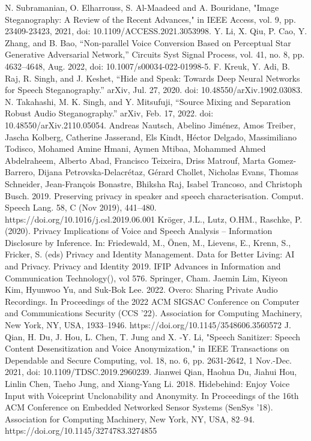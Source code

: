 \documentclass[journal]{IEEEtran} %
\begin{document}
\begin{thebibliography}{00}
     N. Subramanian, O. Elharrouss, S. Al-Maadeed and A. Bouridane, "Image Steganography: A Review of the Recent Advances," in IEEE Access, vol. 9, pp. 23409-23423, 2021, doi: 10.1109/ACCESS.2021.3053998.
     Y. Li, X. Qiu, P. Cao, Y. Zhang, and B. Bao, “Non-parallel Voice Conversion Based on Perceptual Star Generative Adversarial Network,” Circuits Syst Signal Process, vol. 41, no. 8, pp. 4632–4648, Aug. 2022, doi: 10.1007/s00034-022-01998-5.
     F. Kreuk, Y. Adi, B. Raj, R. Singh, and J. Keshet, “Hide and Speak: Towards Deep Neural Networks for Speech Steganography.” arXiv, Jul. 27, 2020. doi: 10.48550/arXiv.1902.03083.
     N. Takahashi, M. K. Singh, and Y. Mitsufuji, “Source Mixing and Separation Robust Audio Steganography.” arXiv, Feb. 17, 2022. doi: 10.48550/arXiv.2110.05054.
     Andreas Nautsch, Abelino Jiménez, Amos Treiber, Jascha Kolberg, Catherine Jasserand, Els Kindt, Héctor Delgado, Massimiliano Todisco, Mohamed Amine Hmani, Aymen Mtibaa, Mohammed Ahmed Abdelraheem, Alberto Abad, Francisco Teixeira, Driss Matrouf, Marta Gomez-Barrero, Dijana Petrovska-Delacrétaz, Gérard Chollet, Nicholas Evans, Thomas Schneider, Jean-François Bonastre, Bhiksha Raj, Isabel Trancoso, and Christoph Busch. 2019. Preserving privacy in speaker and speech characterisation. Comput. Speech Lang. 58, C (Nov 2019), 441–480. https://doi.org/10.1016/j.csl.2019.06.001
     Kröger, J.L., Lutz, O.HM., Raschke, P. (2020). Privacy Implications of Voice and Speech Analysis – Information Disclosure by Inference. In: Friedewald, M., Önen, M., Lievens, E., Krenn, S., Fricker, S. (eds) Privacy and Identity Management. Data for Better Living: AI and Privacy. Privacy and Identity 2019. IFIP Advances in Information and Communication Technology(), vol 576. Springer, Cham.
     Jaemin Lim, Kiyeon Kim, Hyunwoo Yu, and Suk-Bok Lee. 2022. Overo: Sharing Private Audio Recordings. In Proceedings of the 2022 ACM SIGSAC Conference on Computer and Communications Security (CCS '22). Association for Computing Machinery, New York, NY, USA, 1933–1946. https://doi.org/10.1145/3548606.3560572
     J. Qian, H. Du, J. Hou, L. Chen, T. Jung and X. -Y. Li, "Speech Sanitizer: Speech Content Desensitization and Voice Anonymization," in IEEE Transactions on Dependable and Secure Computing, vol. 18, no. 6, pp. 2631-2642, 1 Nov.-Dec. 2021, doi: 10.1109/TDSC.2019.2960239.
     Jianwei Qian, Haohua Du, Jiahui Hou, Linlin Chen, Taeho Jung, and Xiang-Yang Li. 2018. Hidebehind: Enjoy Voice Input with Voiceprint Unclonability and Anonymity. In Proceedings of the 16th ACM Conference on Embedded Networked Sensor Systems (SenSys '18). Association for Computing Machinery, New York, NY, USA, 82–94. https://doi.org/10.1145/3274783.3274855

\end{thebibliography}
\end{document}
